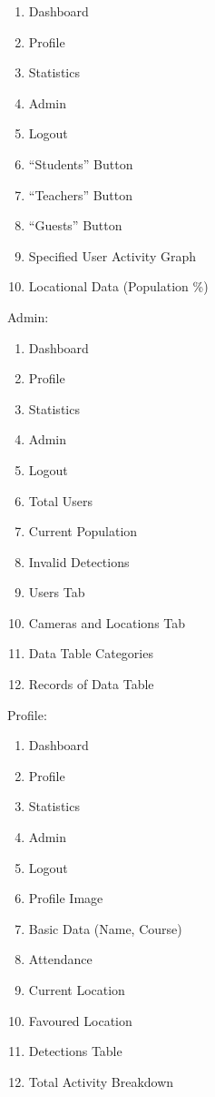 \documentclass[
  english,
  a4paper,
,tablecaptionabove
]{scrartcl}
\providecommand{\tightlist}{%
  \setlength{\itemsep}{0pt}\setlength{\parskip}{0pt}}
\begin{document}
\begin{enumerate}
\def\labelenumi{\arabic{enumi}.}
\tightlist
\item
  Dashboard
\item
  Profile
\item
  Statistics
\item
  Admin
\item
  Logout\\
\item
  \enquote{Students} Button
\item
  \enquote{Teachers} Button
\item
  \enquote{Guests} Button
\item
  Specified User Activity Graph
\item
  Locational Data (Population \%)
\end{enumerate}

Admin:

\begin{enumerate}
\def\labelenumi{\arabic{enumi}.}
\tightlist
\item
  Dashboard
\item
  Profile
\item
  Statistics
\item
  Admin
\item
  Logout
\item
  Total Users
\item
  Current Population
\item
  Invalid Detections
\item
  Users Tab
\item
  Cameras and Locations Tab
\item
  Data Table Categories
\item
  Records of Data Table
\end{enumerate}

Profile:

\begin{enumerate}
\def\labelenumi{\arabic{enumi}.}
\tightlist
\item
  Dashboard
\item
  Profile\\
\item
  Statistics
\item
  Admin
\item
  Logout
\item
  Profile Image
\item
  Basic Data (Name, Course)
\item
  Attendance
\item
  Current Location
\item
  Favoured Location
\item
  Detections Table
\item
  Total Activity Breakdown \newpage
\end{enumerate}
\end{document}
